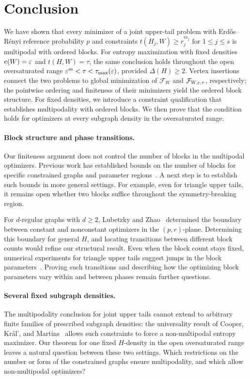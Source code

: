 \section{Conclusion}\label{sec:conclusion}

We have shown that every minimizer of a joint upper-tail problem with
Erdős–Rényi reference probability $p$ and constraints $t(H_j,W)\ge r_j^{m_j}$ for
$1\le j\le s$ is multipodal with ordered blocks. For entropy maximization
with fixed densities $e(W)=\varepsilon$ and $t(H,W)=\tau$, the same conclusion
holds throughout the open oversaturated range
$\varepsilon^m<\tau<\tau_{\max}(\varepsilon)$, provided $\Delta(H)\ge2$.
Vertex insertions connect the two problems to global minimization of
$\mathcal F_W$ and $\mathcal F_{W,\varepsilon,\tau}$, respectively; the pointwise ordering
and finiteness of their minimizers yield the ordered block structure.
For fixed densities, we introduce a constraint
qualification that establishes multipodality with ordered
blocks.  We then prove that the condition holds for optimizers
at every subgraph density in the oversaturated range.

\paragraph{Block structure and phase transitions.}  Our finiteness argument does not
control the number of blocks in the multipodal optimizers.
Previous work has established bounds on the number of blocks for specific
constrained graphs and parameter regions~\cite{ImKimLimNamYangBipodal,
KenyonRadinRenSadun2017,kenyon2014entropy,NeemanRadinSadun2023,NeemanRadinSadun2024,
RadinSadunEdge2Star,RadinSadunNearExtreme}.
A next step is to establish such bounds in more general settings.
For example, even for triangle upper tails, it remains open whether
two blocks suffice throughout the symmetry-breaking region.

For $d$-regular graphs with $d\ge2$, Lubetzky and
Zhao~\cite{lubetzky2015large} determined the boundary between constant and
nonconstant optimizers in the $(p,r)$-plane.
Determining this boundary for general $H$, and locating transitions
between different block counts would refine
our structural result. Even when the block count stays fixed, numerical
experiments for triangle upper tails suggest jumps in the block
parameters~\cite{ImKimLimNamYangBipodal}. Proving such transitions and
describing how the optimizing block parameters vary within and between
phases remain further questions.

\paragraph{Several fixed subgraph densities.}  The multipodality conclusion
for joint upper tails cannot extend to arbitrary finite families of
prescribed subgraph densities: the universality result of Cooper,
Kr\'al', and Martins~\cite{CooperKralMartins2018} allows such constraints
to force a non-multipodal entropy maximizer.
Our theorem for one fixed $H$-density in the open oversaturated range
leaves a natural question between these two settings. Which restrictions
on the number or form of the constrained graphs ensure multipodality,
and which allow non-multipodal optimizers?

